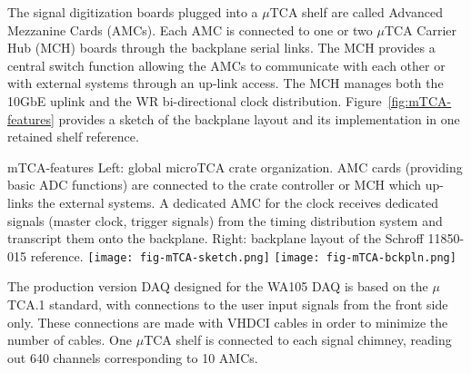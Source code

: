 The signal digitization boards plugged into a $\mu$TCA shelf are
called Advanced Mezzanine Cards (AMCs)\cite{picmg-2006}. Each AMC
is connected to one or two $\mu$TCA Carrier Hub (MCH) boards through
the backplane serial links. The MCH provides a central switch function
allowing the AMCs to communicate with each other or with external
systems through an up-link access. The MCH manages both the 10GbE
uplink and the WR bi-directional clock
distribution. Figure~\ref{fig:mTCA-features} provides a sketch of the
backplane layout and its implementation in one retained shelf
reference. 


\begin{cdrfigure}{mTCA-features}
{\small Left: global microTCA crate organization. AMC cards 
(providing basic ADC functions) are connected to the crate 
controller or MCH which up-links the external systems. A dedicated 
AMC for the clock receives dedicated signals (master clock, trigger 
signals) from the timing distribution system and transcript them onto 
the backplane. Right: backplane layout of the Schroff 11850-015 reference.}
\texttt{[image: fig-mTCA-sketch.png]}\hfill
\texttt{[image: fig-mTCA-bckpln.png]}
\end{cdrfigure}

The production version DAQ designed for the WA105 DAQ is based on the
$\mu$TCA.1 standard, with connections to the user input signals from 
the front side only. These connections are made with VHDCI
cables in order to minimize the number of cables. One $\mu$TCA shelf
is connected to each signal chimney, reading out 640 channels corresponding to 10 AMCs.


